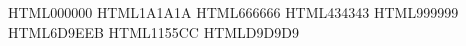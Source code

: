 
\RequirePackage{xcolor}

\definecolor{cvText}     {HTML}{000000} %
\definecolor{cvTextSoft} {HTML}{1A1A1A} %
\definecolor{cvMuted}    {HTML}{666666} %
\definecolor{cvHeading}  {HTML}{434343} %
\definecolor{cvFaint}    {HTML}{999999} %
\definecolor{cvLink}     {HTML}{6D9EEB} %
\definecolor{cvDoi}      {HTML}{1155CC} %
\definecolor{cvRule}     {HTML}{D9D9D9} %
